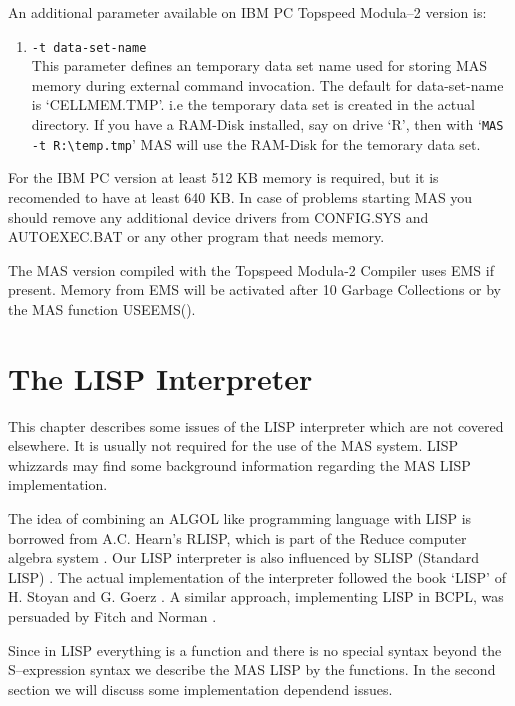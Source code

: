 An additional parameter available on IBM PC Topspeed Modula--2
version is: 
\begin{enumerate}
\item \verb/-t data-set-name/ \\
      This parameter defines an temporary data set name 
      used for storing MAS memory during external command 
      invocation. The default for data-set-name is 
      `CELLMEM.TMP'. i.e the temporary data set is created in 
      the actual directory. If you have a RAM-Disk installed, 
      say on drive `R', then with `\verb/MAS -t R:\temp.tmp/'   
      MAS will use the RAM-Disk for the temorary data set.
\end{enumerate}
For the IBM PC version at least 512 KB memory is required,
but it is recomended to have at least 640 KB.
In case of problems starting MAS you should remove any
additional device drivers from CONFIG.SYS and AUTOEXEC.BAT
or any other program that needs memory.
        
The MAS version compiled with the Topspeed Modula-2 Compiler
uses EMS if present. Memory from EMS will be activated 
after 10 Garbage Collections or by the MAS function USEEMS(). 


\chapter{The LISP Interpreter} %

This chapter describes some issues of the LISP interpreter
which are not covered elsewhere. It is usually not required 
for the use of the MAS system. LISP whizzards may find some
background information regarding the MAS LISP implementation.

The idea of combining an ALGOL like 
programming language with LISP 
is borrowed from A.C. Hearn's RLISP, which is part of the 
Reduce computer algebra system
\cite{Hearn 87}.
Our LISP interpreter is also influenced by SLISP 
(Standard LISP)
\cite{Marti 78}.
The actual implementation of the 
interpreter
followed the book `LISP' of H. Stoyan and G. Goerz
\cite{Stoyan 84}.
A similar approach, implementing LISP in BCPL, 
was persuaded by Fitch and Norman
\cite{Fitch 77}.

Since in LISP everything is a function and there is no 
special syntax beyond the S--expression syntax we 
describe the MAS LISP by the functions.  
In the second section we will discuss some 
implementation dependend issues.


